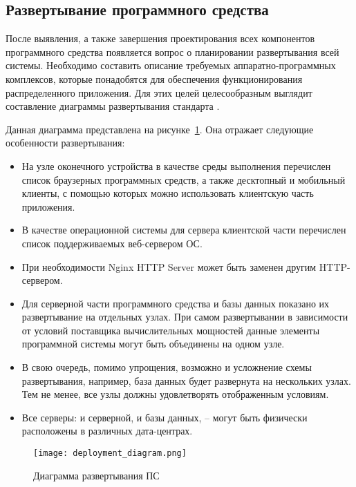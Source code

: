 \subsection{Развертывание программного средства}
\label{sec:design:deployment}

После выявления, а также завершения проектирования всех компонентов программного средства появляется вопрос о планировании развертывания всей системы. Необходимо составить описание требуемых аппаратно-программных комплексов, которые понадобятся для обеспечения функционирования распределенного приложения. Для этих целей целесообразным выглядит составление диаграммы развертывания стандарта \uml. 

Данная диаграмма представлена на рисунке~\ref{fig:design:deployment:diagram}. Она отражает следующие особенности развертывания:

\begin{itemize}
	\item На узле оконечного устройства в качестве среды выполнения перечислен список браузерных программных средств, а также десктопный и мобильный клиенты, с помощью которых можно использовать клиентскую часть приложения.
	\item В качестве операционной системы для сервера клиентской части перечислен список поддерживаемых веб-сервером ОС.
	\item При необходимости Nginx HTTP Server может быть заменен другим HTTP-сервером.
	\item Для серверной части программного средства и базы данных показано их развертывание на отдельных узлах. При самом развертывании в зависимости от условий поставщика вычислительных мощностей данные элементы программной системы могут быть объединены на одном узле.
	\item В свою очередь, помимо упрощения, возможно и усложнение схемы развертывания, например, база данных будет развернута на нескольких узлах. Тем не менее, все узлы должны удовлетворять отображенным условиям.
	\item Все серверы:  и серверной, и базы данных, -- могут быть физически расположены в различных дата-центрах.
\end{itemize}

\begin{figure}[!ht]
\centering
	\texttt{[image: deployment\_diagram.png]}
	\caption{Диаграмма развертывания ПС}
	\label{fig:design:deployment:diagram}
\end{figure}
